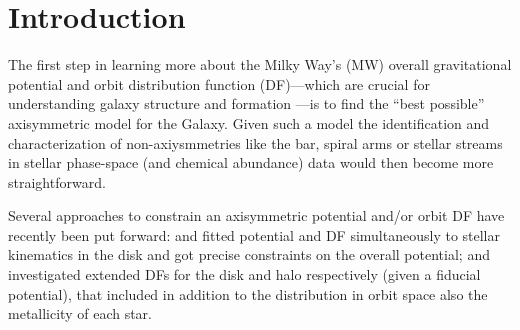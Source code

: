 \documentclass[iop,revtex4,numberedappendix,appendixfloats]{emulateapj}
\begin{document}
\section{Introduction}

The first step in learning more about the Milky Way's (MW) overall gravitational potential and orbit distribution function (DF)---which are crucial for understanding galaxy structure and formation \citep{013A&ARv..21...61R}---is to find the ``best possible'' axisymmetric model for the Galaxy. Given such a model the identification and characterization of non-axiysmmetries like the bar, spiral arms or stellar streams in stellar phase-space (and chemical abundance) data would then become more straightforward.

Several approaches to constrain an axisymmetric potential and/or orbit DF have recently been put forward: \citet{2013ApJ...779..115B} and \citet{2014MNRAS.445.3133P} fitted potential and DF simultaneously to stellar kinematics in the disk and got precise constraints on the overall potential; \citet{2015MNRAS.449.3479S} and \citet{2016MNRAS.460.1725D} investigated extended DFs for the disk and halo respectively (given a fiducial potential), that included in addition to the distribution in orbit space also the metallicity of each star. 
\end{document}
